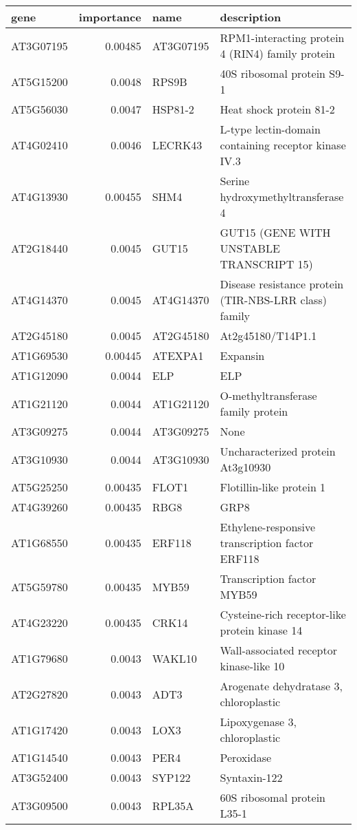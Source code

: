 \documentclass[a4paper]{article}
\begin{document}
\begin{center}
\begin{tabular}{lrll}
gene & importance & name & description\\
\hline
AT3G07195 & 0.00485 & AT3G07195 & RPM1-interacting protein 4 (RIN4) family protein\\
AT5G15200 & 0.0048 & RPS9B & 40S ribosomal protein S9-1\\
AT5G56030 & 0.0047 & HSP81-2 & Heat shock protein 81-2\\
AT4G02410 & 0.0046 & LECRK43 & L-type lectin-domain containing receptor kinase IV.3\\
AT4G13930 & 0.00455 & SHM4 & Serine hydroxymethyltransferase 4\\
AT2G18440 & 0.0045 & GUT15 & GUT15 (GENE WITH UNSTABLE TRANSCRIPT 15)\\
AT4G14370 & 0.0045 & AT4G14370 & Disease resistance protein (TIR-NBS-LRR class) family\\
AT2G45180 & 0.0045 & AT2G45180 & At2g45180/T14P1.1\\
AT1G69530 & 0.00445 & ATEXPA1 & Expansin\\
AT1G12090 & 0.0044 & ELP & ELP\\
AT1G21120 & 0.0044 & AT1G21120 & O-methyltransferase family protein\\
AT3G09275 & 0.0044 & AT3G09275 & None\\
AT3G10930 & 0.0044 & AT3G10930 & Uncharacterized protein At3g10930\\
AT5G25250 & 0.00435 & FLOT1 & Flotillin-like protein 1\\
AT4G39260 & 0.00435 & RBG8 & GRP8\\
AT1G68550 & 0.00435 & ERF118 & Ethylene-responsive transcription factor ERF118\\
AT5G59780 & 0.00435 & MYB59 & Transcription factor MYB59\\
AT4G23220 & 0.00435 & CRK14 & Cysteine-rich receptor-like protein kinase 14\\
AT1G79680 & 0.0043 & WAKL10 & Wall-associated receptor kinase-like 10\\
AT2G27820 & 0.0043 & ADT3 & Arogenate dehydratase 3, chloroplastic\\
AT1G17420 & 0.0043 & LOX3 & Lipoxygenase 3, chloroplastic\\
AT1G14540 & 0.0043 & PER4 & Peroxidase\\
AT3G52400 & 0.0043 & SYP122 & Syntaxin-122\\
AT3G09500 & 0.0043 & RPL35A & 60S ribosomal protein L35-1\\

\end{tabular}
\end{center}
\end{document}
